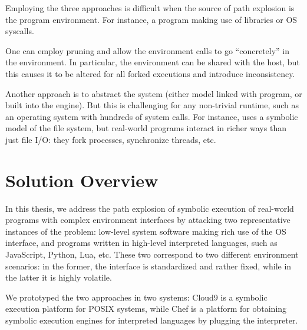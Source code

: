 
Employing the three approaches is difficult when the source of path explosion is the program environment.  For instance, a program making use of libraries or OS syscalls.

One can employ pruning and allow the environment calls to go ``concretely'' in the environment.  In particular, the environment can be shared with the host, but this causes it to be altered for all forked executions and introduce inconsistency.

Another approach is to abstract the system (either model linked with program, or built into the engine).  But this is challenging for any non-trivial runtime, such as an operating system with hundreds of system calls.  For instance, \klee uses a symbolic model of the file system, but real-world programs interact in richer ways than just file I/O: they fork processes, synchronize threads, etc.


\section{Solution Overview}

In this thesis, we address the path explosion of symbolic execution of real-world programs with complex environment interfaces by attacking two representative instances of the problem: low-level system software making rich use of the OS interface, and programs written in high-level interpreted languages, such as JavaScript, Python, Lua, etc.  These two correspond to two different environment scenarios: in the former, the interface is standardized and rather fixed, while in the latter it is highly volatile.

We prototyped the two approaches in two systems: Cloud9 is a symbolic execution platform for POSIX systems, while Chef is a platform for obtaining symbolic execution engines for interpreted languages by plugging the interpreter.

